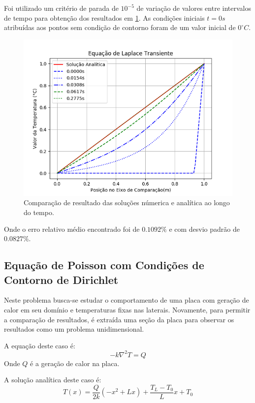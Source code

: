 Foi utilizado um critério de parada de $10^{-5}$ de variação de valores entre intervalos de tempo para obtenção dos resultados em \ref{laplace_d_trans_comp}.
As condições iniciais $t=0s$ atribuídas aos pontos sem condição de contorno foram de um valor inicial de $0^{\circ}C$.
\begin{figure}[H]
    \centering
    \includegraphics[width=.7\linewidth]{figures/laplace_dirichlet_transient_comparison.png}
    \caption{Comparação de resultado das soluções númerica e analítica ao longo do tempo.}
    \label{laplace_d_trans_comp}
\end{figure}
Onde o erro relativo médio encontrado foi de $0.1092\%$ e com desvio padrão de $0.0827\%$.


\subsection{\textbf{Equação de Poisson com Condições de Contorno de Dirichlet}}
Neste problema busca-se estudar o comportamento de uma placa com geração de calor em seu domínio e temperaturas fixas nas laterais.
Novamente, para permitir a comparação de resultados, é extraída uma seção da placa para observar os resultados como um problema unidimensional.

A equação deste caso é:
\begin{equation}
    -k\nabla^2 T = Q
    \label{poisson_d_perm_eq} 
\end{equation}
Onde $Q$ é a geração de calor na placa.

A solução analítica deste caso é:
\begin{equation}
    T(x) = \dfrac{Q}{2k}(-x^2 + L x) + \dfrac{T_L-T_0}{L} x + T_0
    \label{poisson_d_sol} 
\end{equation}

